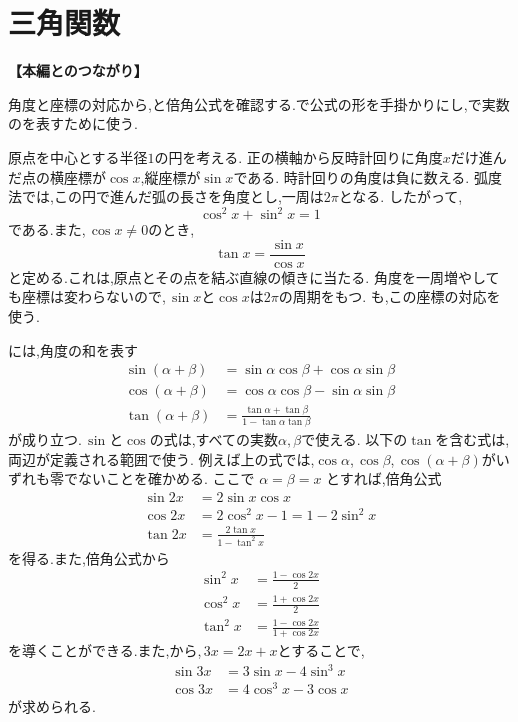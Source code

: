 \section{三角関数}\label{節：三角関数}
  \noindent\textbf{【本編とのつながり】}\par
  角度と座標の対応から,と倍角公式を確認する.で公式の形を手掛かりにし,で実数のを表すために使う.

  原点を中心とする半径$1$の円を考える.
  正の横軸から反時計回りに角度$x$だけ進んだ点の横座標が$\cos x$,縦座標が$\sin x$である.
  時計回りの角度は負に数える.
  弧度法では,この円で進んだ弧の長さを角度とし,一周は$2\pi$となる.
  したがって,
  \[
    \cos^2x+\sin^2x=1
  \]
  である.また,\,$\cos x\ne0$のとき,
  \[
    \tan x=\frac{\sin x}{\cos x}
  \]
  と定める.これは,原点とその点を結ぶ直線の傾きに当たる.
  角度を一周増やしても座標は変わらないので,\,$\sin x$と$\cos x$は$2\pi$の周期をもつ.
  も,この座標の対応を使う.

  には,角度の和を表す
  \begin{align*}
    \sin(\alpha+\beta)
      &=\sin\alpha\cos\beta+\cos\alpha\sin\beta\\
    \cos(\alpha+\beta)
      &=\cos\alpha\cos\beta-\sin\alpha\sin\beta\\
    \tan(\alpha+\beta)
      &=\frac{\tan\alpha+\tan\beta}
              {1-\tan\alpha\tan\beta}
  \end{align*}
  が成り立つ.\,$\sin$と$\cos$の式は,すべての実数$\alpha,\beta$で使える.
  以下の$\tan$を含む式は,両辺が定義される範囲で使う.
  例えば上の式では,$\cos\alpha$,\,$\cos\beta$,\,$\cos(\alpha+\beta)$がいずれも零でないことを確かめる.
  ここで $\alpha=\beta=x$ とすれば,倍角公式
  \begin{align*}
    \sin 2x&=2\sin x\cos x\\
    \cos 2x&=2\cos^2x-1=1-2\sin^2x\\
    \tan 2x&=\frac{2\tan x}{1-\tan^2x}
  \end{align*}
  を得る.また,倍角公式から
  \begin{align*}
    \sin^2x&=\frac{1-\cos 2x}{2}\\
    \cos^2x&=\frac{1+\cos 2x}{2}\\
    \tan^2x&=\frac{1-\cos 2x}{1+\cos 2x}
  \end{align*}
  を導くことができる.また,から,\,$3x=2x+x$とすることで,
  \begin{align*}
    \sin 3x&=3\sin x-4\sin^3x\\
    \cos 3x&=4\cos^3x-3\cos x
  \end{align*}
  が求められる.
